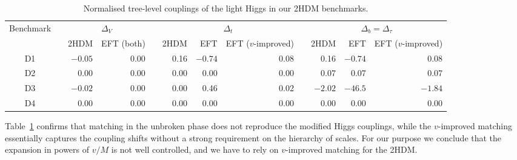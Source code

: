 \begin{table}[t] \renewcommand{\arraystretch}{1.2}
\setlength{\tabcolsep}{0.3em} \centering \footnotesize
  \begin{tabular}{c c rr c rrr c rrr} \toprule
\multirow{2}{*}{Benchmark} &\hspace*{0.5em}&
\multicolumn{2}{c}{$\Delta_V$} &\hspace*{0.5em}&
\multicolumn{3}{c}{$\Delta_t$} &\hspace*{1em}&
\multicolumn{3}{c}{$\Delta_b=\Delta_\tau$} \\ \cmidrule{3-4}
\cmidrule{6-8} \cmidrule{10-12} && 2HDM & EFT (both) && 2HDM & EFT &
EFT ($v$-improved) && 2HDM & EFT & EFT ($v$-improved) \\ \midrule D1
&&$-0.05$ & 0.00 && 0.16 & $-0.74$ & 0.08 && 0.16 & $-0.74$ & 0.08 \\
D2 && 0.00 & 0.00 && 0.00 & 0.00 & 0.00 && 0.07 & 0.07 & 0.07 \\ D3
&&$-0.02$ & 0.00 && 0.00 & 0.46 & 0.02 && $-2.02$ & $-46.5$ & $-1.84$
\\ D4 && 0.00 & 0.00 && 0.00 & 0.00 & 0.00 && 0.00 & 0.00 & 0.00 \\
\bottomrule
  \end{tabular}
  \caption{Normalised tree-level couplings of the light Higgs in our
2HDM benchmarks. }
  \label{tab:2HDM_couplings_tree} \setlength{\tabcolsep}{0.5em}
\end{table}
 
Table~\ref{tab:2HDM_couplings_tree} confirms that matching in the
unbroken phase does not reproduce the modified Higgs couplings, while
the $v$-improved matching essentially captures the coupling shifts
without a strong requirement on the hierarchy of scales. For our
purpose we conclude that the expansion in powers of $v/M$ is not well
controlled, and we have to rely on $v$-improved matching for the
2HDM.

